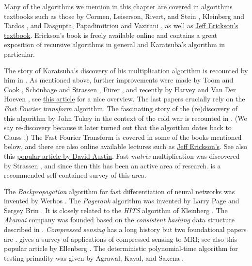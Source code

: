 Many of the algorithms we mention in this chapter are covered in
algorithms textbooks such as those by Cormen, Leiserson, Rivert, and
Stein \cite{CLRS}, Kleinberg and Tardos \cite{KleinbergTardos06}, and
Dasgupta, Papadimitriou and Vazirani \cite{DasguptaPV08}, as well as
\href{http://jeffe.cs.illinois.edu/teaching/algorithms/}{Jeff Erickson's
textbook}. Erickson's book is freely available online and contains a
great exposition of recursive algorithms in general and Karatsuba's
algorithm in particular.

The story of Karatsuba's discovery of his multiplication algorithm is
recounted by him in \cite{Karatsuba95}. As mentioned above, further
improvements were made by Toom and Cook \cite{Toom63, Cook66}, Schönhage
and Strassen \cite{SchonhageStrassen71}, Fürer \cite{Furer07}, and
recently by Harvey and Van Der Hoeven \cite{HarveyvdHoeven2019}, see
\href{https://www.quantamagazine.org/mathematicians-discover-the-perfect-way-to-multiply-20190411/}{this
article} for a nice overview. The last papers crucially rely on the
\emph{Fast Fourier transform} algorithm. The fascinating story of the
(re)discovery of this algorithm by John Tukey in the context of the cold
war is recounted in \cite{Cooley87FFTdiscovery}. (We say re-discovery
because it later turned out that the algorithm dates back to Gauss
\cite{heideman1985gauss}.) The Fast Fourier Transform is covered in some
of the books mentioned below, and there are also online available
lectures such as
\href{http://jeffe.cs.illinois.edu/teaching/algorithms/}{Jeff
Erickson's}. See also this
\href{http://www.ams.org/samplings/feature-column/fcarc-multiplication}{popular
article by David Austin}. Fast \emph{matrix} multiplication was
discovered by Strassen \cite{Strassen69}, and since then this has been
an active area of research. \cite{Blaser13} is a recommended
self-contained survey of this area.

The \emph{Backpropagation} algorithm for fast differentiation of neural
networks was invented by Werbos \cite{Werbos74}. The \emph{Pagerank}
algorithm was invented by Larry Page and Sergey Brin \cite{pagerank99}.
It is closely related to the \emph{HITS} algorithm of Kleinberg
\cite{Kleinber99}. The \emph{Akamai} company was founded based on the
\emph{consistent hashing} data structure described in \cite{Akamai97}.
\emph{Compressed sensing} has a long history but two foundational papers
are \cite{CandesRombergTao06, Donoho2006compressed}.
\cite{compressedmri08} gives a survey of applications of compressed
sensing to MRI; see also this popular article by Ellenberg
\cite{Ellenberg10wired}. The deterministic polynomial-time algorithm for
testing primality was given by Agrawal, Kayal, and Saxena
\cite{AgrawalKayalSaxena04}.

